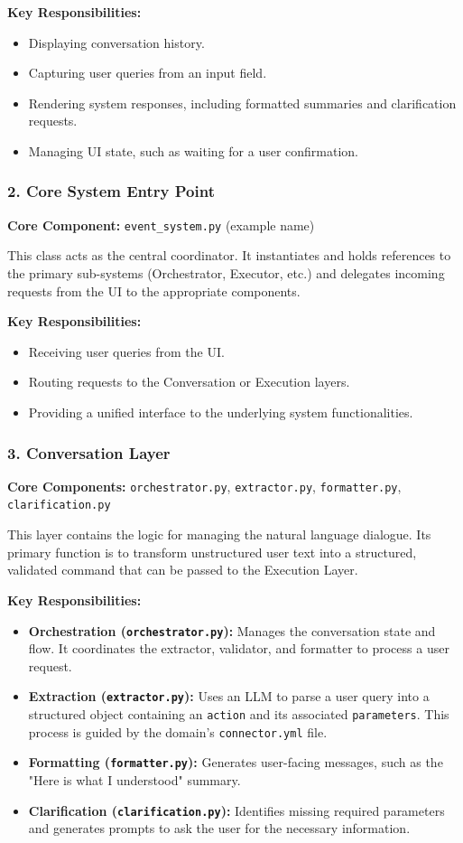 \documentclass[12pt, a4paper]{article}
\begin{document}
\textbf{Key Responsibilities:}
\begin{itemize}
    \item Displaying conversation history.
    \item Capturing user queries from an input field.
    \item Rendering system responses, including formatted summaries and clarification requests.
    \item Managing UI state, such as waiting for a user confirmation.
\end{itemize}

\subsubsection{2. Core System Entry Point}
\textbf{Core Component:} \texttt{event\_system.py} (example name)

This class acts as the central coordinator. It instantiates and holds references to the primary sub-systems (Orchestrator, Executor, etc.) and delegates incoming requests from the UI to the appropriate components.

\textbf{Key Responsibilities:}
\begin{itemize}
    \item Receiving user queries from the UI.
    \item Routing requests to the Conversation or Execution layers.
    \item Providing a unified interface to the underlying system functionalities.
\end{itemize}

\subsubsection{3. Conversation Layer}
\textbf{Core Components:} \texttt{orchestrator.py}, \texttt{extractor.py}, \texttt{formatter.py}, \texttt{clarification.py}

This layer contains the logic for managing the natural language dialogue. Its primary function is to transform unstructured user text into a structured, validated command that can be passed to the Execution Layer.

\textbf{Key Responsibilities:}
\begin{itemize}
    \item \textbf{Orchestration (\texttt{orchestrator.py}):} Manages the conversation state and flow. It coordinates the extractor, validator, and formatter to process a user request.
    \item \textbf{Extraction (\texttt{extractor.py}):} Uses an LLM to parse a user query into a structured object containing an \texttt{action} and its associated \texttt{parameters}. This process is guided by the domain's \texttt{connector.yml} file.
    \item \textbf{Formatting (\texttt{formatter.py}):} Generates user-facing messages, such as the "Here is what I understood" summary.
    \item \textbf{Clarification (\texttt{clarification.py}):} Identifies missing required parameters and generates prompts to ask the user for the necessary information.
\end{itemize}
\end{document}
